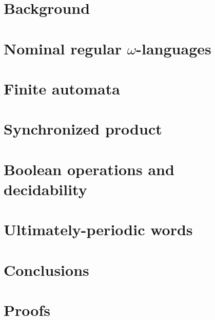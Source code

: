 \documentclass[orivec]{llncs}
\begin{document}
\section{Background}\label{sec:background}

\section{Nominal regular \texorpdfstring{$\omega$}{omega}-languages}\label{sec:languages}


\section{Finite automata}\label{sec:hd-automata}



\section{Synchronized product}\label{sec:sync-product}


\section{Boolean operations and decidability}\label{sec:boolean-operations-decidability}

\section{Ultimately-periodic words}\label{sec:up-words}

\section{Conclusions}\label{sec:conclusions}






%

\appendix
\section{Proofs}

\end{document}
